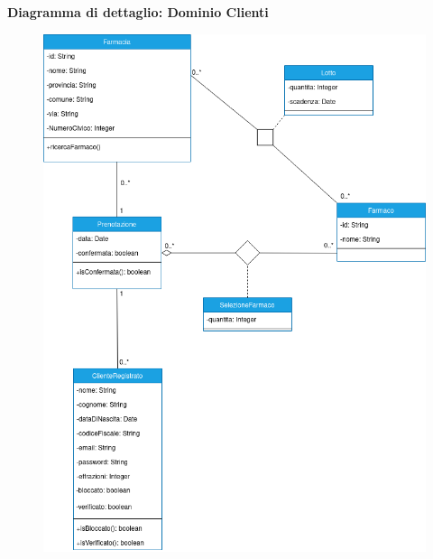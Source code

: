 \vspace{2em}

\textbf{Diagramma di dettaglio: Dominio Clienti}

\begin{figure}[h!]
    \begin{center}
        \includegraphics[scale=0.53]{immagini/DominioCliente-progettazione.png}
    \end{center}
\end{figure}

\newpage

